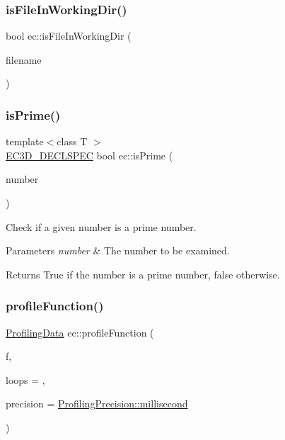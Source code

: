 \subsubsection{\texorpdfstring{is\+File\+In\+Working\+Dir()}{isFileInWorkingDir()}}
{\footnotesize\ttfamily bool ec\+::is\+File\+In\+Working\+Dir (\begin{DoxyParamCaption}\item[{const char $\ast$}]{filename }\end{DoxyParamCaption})}

\mbox{\label{namespaceec_a56b1f3bdf5dbaf491d466504cdcfd972}} 
\subsubsection{\texorpdfstring{is\+Prime()}{isPrime()}}
{\footnotesize\ttfamily template$<$class T $>$ \\
\mbox{\hyperlink{_common_8h_aac42573e202ca3dd4d259c81691e2369}{E\+C3\+D\+\_\+\+D\+E\+C\+L\+S\+P\+EC}} bool ec\+::is\+Prime (\begin{DoxyParamCaption}\item[{T}]{number }\end{DoxyParamCaption})}



Check if a given number is a prime number. 


\begin{DoxyParams}{Parameters}
{\em number} & The number to be examined. \\
\hline
\end{DoxyParams}
\begin{DoxyReturn}{Returns}
True if the number is a prime number, false otherwise. 
\end{DoxyReturn}
\mbox{\label{namespaceec_a9cbcabe8cfdb73cc1b1bf12985d0bb49}} 
\subsubsection{\texorpdfstring{profile\+Function()}{profileFunction()}}
{\footnotesize\ttfamily \mbox{\hyperlink{structec_1_1_profiling_data}{Profiling\+Data}} ec\+::profile\+Function (\begin{DoxyParamCaption}\item[{const std\+::function$<$ void()$>$ \&}]{f,  }\item[{unsigned int}]{loops = {},  }\item[{Profiling\+Precision}]{precision = {\ttfamily \mbox{\hyperlink{_profiler_8h_ad14d98cdcfa4397ac3a0af6ce942c55d}{Profiling\+Precision\+::millisecond}}} }\end{DoxyParamCaption})}

